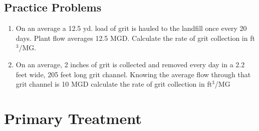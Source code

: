 \subsection{Practice Problems} 

\begin{enumerate}
\item On an average a 12.5 yd. load of grit is hauled to the landfill once every 20 days. Plant flow averages 12.5 MGD. Calculate the rate of grit collection in ft$^3$/MG.\\

\item On an average, 2 inches of grit is collected and removed every day in a 2.2 feet wide, 205 feet long grit channel.  Knowing the average flow through that grit channel is 10 MGD calculate the rate of grit collection in ft$^3$/MG\\

\end{enumerate}

\newpage
\section{Primary Treatment} 
